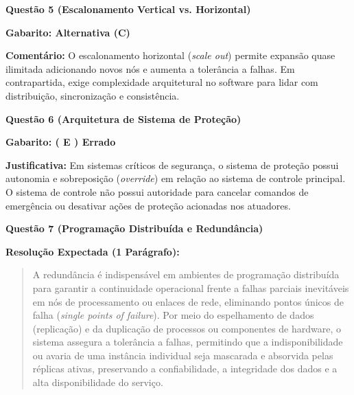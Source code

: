 \documentclass[12pt,a4paper]{article}
\begin{document}
\vspace{0.5cm}

\textbf{Questão 5 (Escalonamento Vertical vs. Horizontal)}

\textbf{Gabarito: Alternativa (C)}

\textbf{Comentário:} O escalonamento horizontal (\textit{scale out}) permite expansão quase ilimitada adicionando novos nós e aumenta a tolerância a falhas. Em contrapartida, exige complexidade arquitetural no software para lidar com distribuição, sincronização e consistência.

\vspace{0.5cm}

\textbf{Questão 6 (Arquitetura de Sistema de Proteção)}

\textbf{Gabarito: ( E ) Errado}

\textbf{Justificativa:} Em sistemas críticos de segurança, o sistema de proteção possui autonomia e sobreposição (\textit{override}) em relação ao sistema de controle principal. O sistema de controle não possui autoridade para cancelar comandos de emergência ou desativar ações de proteção acionadas nos atuadores.

\vspace{0.5cm}

\textbf{Questão 7 (Programação Distribuída e Redundância)}

\textbf{Resolução Expectada (1 Parágrafo):}
\begin{quote}
A redundância é indispensável em ambientes de programação distribuída para garantir a continuidade operacional frente a falhas parciais inevitáveis em nós de processamento ou enlaces de rede, eliminando pontos únicos de falha (\textit{single points of failure}). Por meio do espelhamento de dados (replicação) e da duplicação de processos ou componentes de hardware, o sistema assegura a tolerância a falhas, permitindo que a indisponibilidade ou avaria de uma instância individual seja mascarada e absorvida pelas réplicas ativas, preservando a confiabilidade, a integridade dos dados e a alta disponibilidade do serviço.
\end{quote}

\vspace{0.5cm}
\end{document}
